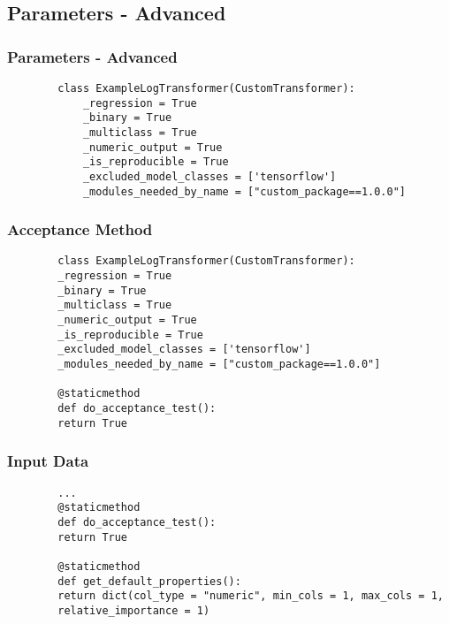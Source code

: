 \documentclass[11pt,
               aspectratio=169,
               hyperref={colorlinks}
               ]{beamer}
\begin{document}
		\subsection{Parameters - Advanced}
	\begin{frame}[fragile]
		\frametitle{Parameters - Advanced}
		\begin{verbatim}
		class ExampleLogTransformer(CustomTransformer):
			_regression = True
			_binary = True
			_multiclass = True
			_numeric_output = True
			_is_reproducible = True
			_excluded_model_classes = ['tensorflow']
			_modules_needed_by_name = ["custom_package==1.0.0"]
		\end{verbatim}
			
\end{frame}
	\begin{frame}[fragile]
		\frametitle{Acceptance Method}
		\begin{verbatim}
		class ExampleLogTransformer(CustomTransformer):
		_regression = True
		_binary = True
		_multiclass = True
		_numeric_output = True
		_is_reproducible = True
		_excluded_model_classes = ['tensorflow']
		_modules_needed_by_name = ["custom_package==1.0.0"]
	
		@staticmethod
		def do_acceptance_test():
		return True
		\end{verbatim}
			
\end{frame}
	\begin{frame}[fragile]
		\frametitle{Input Data}
		\begin{verbatim}
		...
		@staticmethod
		def do_acceptance_test():
		return True

		@staticmethod
		def get_default_properties():
		return dict(col_type = "numeric", min_cols = 1, max_cols = 1, 
		relative_importance = 1)
		\end{verbatim}
\end{frame}
\end{document}
